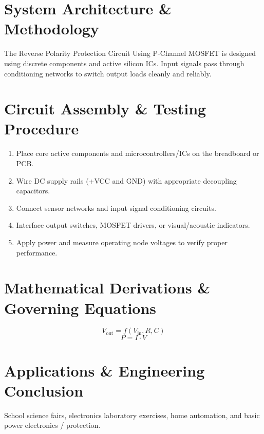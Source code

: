 \documentclass[11pt,a4paper]{article}
\begin{document}
\section{System Architecture \& Methodology}
The Reverse Polarity Protection Circuit Using P-Channel MOSFET is designed using discrete components and active silicon ICs. Input signals pass through conditioning networks to switch output loads cleanly and reliably.

\section{Circuit Assembly \& Testing Procedure}
\begin{enumerate}
    \item Place core active components and microcontrollers/ICs on the breadboard or PCB.
    \item Wire DC supply rails (+VCC and GND) with appropriate decoupling capacitors.
    \item Connect sensor networks and input signal conditioning circuits.
    \item Interface output switches, MOSFET drivers, or visual/acoustic indicators.
    \item Apply power and measure operating node voltages to verify proper performance.
\end{enumerate}

\section{Mathematical Derivations \& Governing Equations}
\begin{equation}
V_{\text{out}} = f(V_{\text{in}}, R, C)
\end{equation}
\begin{equation}
P = I \cdot V
\end{equation}

\section{Applications \& Engineering Conclusion}
School science fairs, electronics laboratory exercises, home automation, and basic power electronics / protection.
\end{document}
